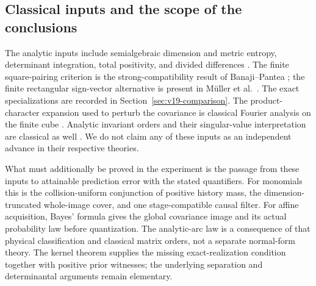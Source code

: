 \subsection{Classical inputs and the scope of the conclusions}
The analytic inputs include semialgebraic dimension and metric entropy,
determinant integration, total positivity, and divided differences
\cite{BochnakCosteRoy,ForresterAndreief,Pinkus,deBoor,
YomdinComte,ZhangKileel,ComteHalupczok}. The finite square-pairing
criterion is the strong-compatibility result of Banaji--Pantea
\cite{BanajiPantea2016}; the finite rectangular sign-vector alternative
is present in M\"uller et al.\ \cite{MullerEtAl2016}. The exact
specializations are recorded in Section~\ref{sec:v19-comparison}.
The product-character expansion used to perturb the covariance is
classical Fourier analysis on the finite cube
\cite[Section 2.2]{deWolf2008}. Analytic invariant orders and their
singular-value interpretation are classical as well
\cite{KavehMakhnatch}. We do not claim any of these inputs as an
independent advance in their respective theories.

What must additionally be proved in the experiment is the passage from
these inputs to attainable prediction error with the stated quantifiers.
For monomials this is the collision-uniform conjunction of positive
history mass, the dimension-truncated whole-image cover, and one
stage-compatible causal filter. For affine acquisition, Bayes' formula
gives the global covariance image and its actual probability law before
quantization. The analytic-arc law is a consequence of that physical
classification and classical matrix orders, not a separate normal-form
theory. The kernel theorem supplies the missing exact-realization
condition together with positive prior witnesses; the underlying
separation and determinantal arguments remain elementary.

